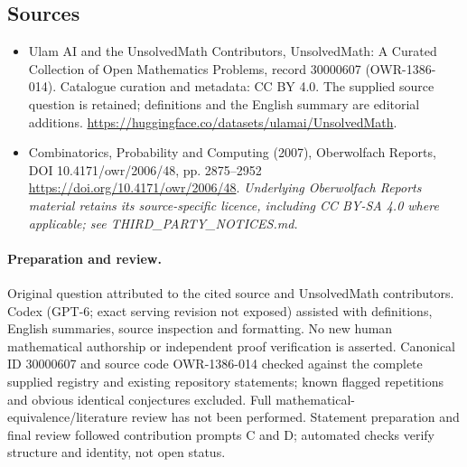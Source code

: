 \documentclass[11pt]{article}
\begin{document}
\subsection{Sources}
\begin{itemize}
\item[\hypertarget{source:30000607:1}{S1}] Ulam AI and the UnsolvedMath Contributors, UnsolvedMath: A Curated Collection of Open Mathematics Problems, record 30000607 (OWR-1386-014). Catalogue curation and metadata: CC BY 4.0. The supplied source question is retained; definitions and the English summary are editorial additions.
\url{https://huggingface.co/datasets/ulamai/UnsolvedMath}.
\item[\hypertarget{source:30000607:2}{S2}] Combinatorics, Probability and Computing (2007), Oberwolfach Reports, DOI 10.4171/owr/2006/48, pp. 2875--2952
\url{https://doi.org/10.4171/owr/2006/48}.
\textit{Underlying Oberwolfach Reports material retains its source-specific licence, including CC BY-SA 4.0 where applicable; see THIRD\_PARTY\_NOTICES.md.}
\end{itemize}
\paragraph{Preparation and review.}
Original question attributed to the cited source and UnsolvedMath contributors. Codex (GPT-6; exact serving revision not exposed) assisted with definitions, English summaries, source inspection and formatting. No new human mathematical authorship or independent proof verification is asserted. Canonical ID 30000607 and source code OWR-1386-014 checked against the complete supplied registry and existing repository statements; known flagged repetitions and obvious identical conjectures excluded. Full mathematical-equivalence/literature review has not been performed. Statement preparation and final review followed contribution prompts C and D; automated checks verify structure and identity, not open status.
\label{end:30000607}
\end{document}
